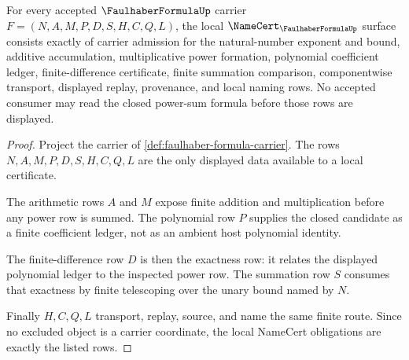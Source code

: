 \begin{theorem}
\label{thm:faulhaber-formula-namecert-obligations}
For every accepted $\FaulhaberFormulaUp$ carrier $F=(N,A,M,P,D,S,H,C,Q,L)$, the local $\NameCert_{\FaulhaberFormulaUp}$ surface consists exactly of carrier admission for the natural-number exponent and bound, additive accumulation, multiplicative power formation, polynomial coefficient ledger, finite-difference certificate, finite summation comparison, componentwise transport, displayed replay, provenance, and local naming rows. No accepted consumer may read the closed power-sum formula before those rows are displayed.
\end{theorem}
\begin{proof}
Project the carrier of \autoref{def:faulhaber-formula-carrier}. The rows $N,A,M,P,D,S,H,C,Q,L$ are the only displayed data available to a local certificate.

The arithmetic rows $A$ and $M$ expose finite addition and multiplication before any power row is summed. The polynomial row $P$ supplies the closed candidate as a finite coefficient ledger, not as an ambient host polynomial identity.

The finite-difference row $D$ is then the exactness row: it relates the displayed polynomial ledger to the inspected power row. The summation row $S$ consumes that exactness by finite telescoping over the unary bound named by $N$.

Finally $H,C,Q,L$ transport, replay, source, and name the same finite route. Since no excluded object is a carrier coordinate, the local NameCert obligations are exactly the listed rows.
\end{proof}

